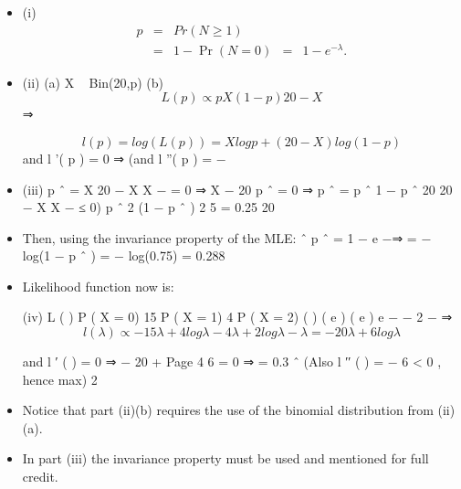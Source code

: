 \documentclass[a4paper,12pt]{article}
\begin{document}
\begin{itemize}
\item (i) \begin{eqnarray*}p &=& Pr( N \geq 1) \\ &=& 1 − \Pr( N = 0) &=& 1 − e^{−\lambda} .\end{eqnarray*}
\item (ii) (a)
X ~ Bin(20,p)
(b)
\[L ( p ) \propto  p X (1 − p ) 20 − X \]
⇒ 

\[l ( p ) = log( L ( p )) = X log p + (20 − X ) log(1 − p )\]
and l '( p ) = 0 ⇒
(and l ''( p ) = −
\item (iii)
p ˆ =
X 20 − X
X
−
= 0 ⇒ X − 20 p ˆ = 0 ⇒ p ˆ =
p ˆ
1 − p ˆ
20
20 − X
X
−
≤ 0)
p ˆ 2 (1 − p ˆ ) 2
5
= 0.25
20
\item Then, using the invariance property of the MLE:
ˆ
p ˆ = 1 − e −\lambda  ⇒ \hat{\lambda} = − log(1 − p ˆ ) = − log(0.75) = 0.288
\item Likelihood function now is:

(iv)
L ( \lambda  ) \propto  P ( X = 0) 15 \times  P ( X = 1) 4 \times  P ( X = 2)
( ) ( \lambda  e ) ( \lambda  e )
\propto  e −
−
2 −\lambda 
⇒ 
\[ l ( \lambda  ) \propto − 15 \lambda  + 4 log \lambda  − 4 \lambda  + 2 log \lambda  − \lambda  = − 20 \lambda  + 6 log \lambda \]

and l ′ ( \lambda  ) = 0 ⇒ − 20 +
Page 4
6
= 0 ⇒ \hat{\lambda} = 0.3
ˆ \lambda 
(Also l ′′ ( \lambda  ) = −
6
< 0 , hence max)
\hat{\lambda} 2
\item Notice that part (ii)(b) requires the use of the binomial distribution from (ii)(a).
\item In part (iii)
the invariance property must be used and mentioned for full credit.
\end{itemize}
\newpage
\end{document}
